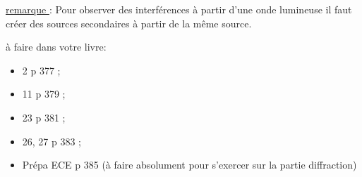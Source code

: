 \underline{remarque }: Pour observer des interférences à partir d'une onde lumineuse il faut créer des sources secondaires à partir de la même source.



 à faire dans votre livre:
\begin{itemize}
\item 2 p 377 ; 
\item 11 p 379 ;
\item  23 p 381 ;
\item  26, 27 p 383 ;
\item Prépa ECE p 385 (à faire absolument pour s'exercer sur la partie diffraction)
\end{itemize}
